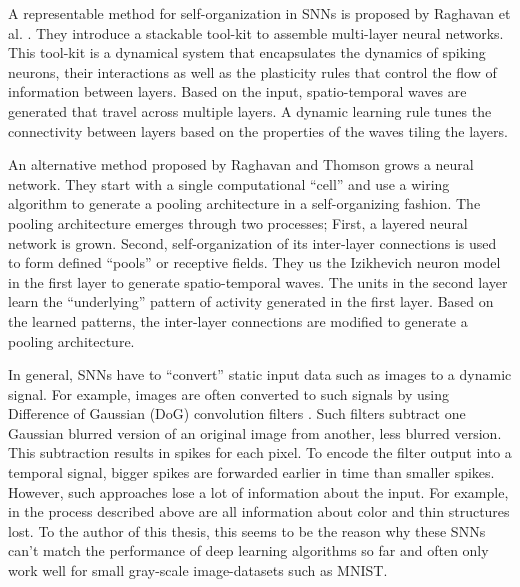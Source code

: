 A representable method for self-organization in SNNs is proposed by Raghavan et al. .
They introduce a stackable tool-kit to assemble multi-layer neural networks.
This tool-kit is a dynamical system that encapsulates the dynamics of spiking neurons, their interactions as well as the plasticity rules that control the flow of information between layers.
Based on the input, spatio-temporal waves are generated that travel across multiple layers.
A dynamic learning rule tunes the connectivity between layers based on the properties of the waves tiling the layers.

An alternative method proposed by Raghavan and Thomson  grows a neural network.
They start with a single computational ``cell'' and use a wiring algorithm to generate a pooling architecture in a self-organizing fashion.
The pooling architecture emerges through two processes; First, a layered neural network is grown. Second, self-organization of its inter-layer connections is used to form defined ``pools'' or receptive fields.
They us the Izikhevich neuron model  in the first layer to generate spatio-temporal waves.
The units in the second layer learn the ``underlying'' pattern of activity generated in the first layer. 
Based on the learned patterns, the inter-layer connections are modified to generate a pooling architecture.

In general, SNNs have to ``convert'' static input data such as images to a dynamic signal.
For example, images are often converted to such signals by using Difference of Gaussian (DoG) convolution filters .
Such filters subtract one Gaussian blurred version of an original image from another, less blurred version.
This subtraction results in spikes for each pixel.
To encode the filter output into a temporal signal, bigger spikes are forwarded earlier in time than smaller spikes.
However, such approaches lose a lot of information about the input.
For example, in the process described above are all information about color and thin structures lost.
To the author of this thesis, this seems to be the reason why these SNNs can't match the performance of deep learning algorithms so far and often only work well for small gray-scale image-datasets such as MNIST.


